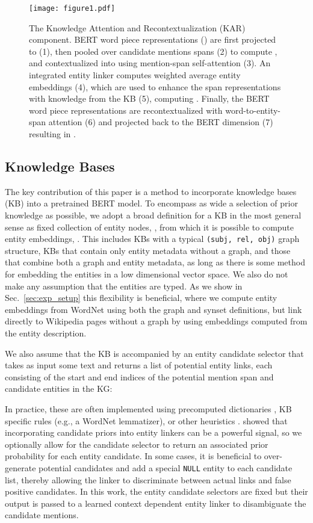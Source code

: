 \documentclass[11pt,a4paper]{article}
\begin{document}
\begin{figure*}[!t]
\centering
\texttt{[image: figure1.pdf]}
\caption{The Knowledge Attention and Recontextualization (KAR) component.
BERT word piece representations () are first projected to  (1), then pooled over candidate mentions spans (2) to compute , and contextualized into  using mention-span self-attention (3).
An integrated entity linker computes weighted average entity embeddings  (4), which are used to enhance the span representations with knowledge from the KB (5), computing .
Finally, the BERT word piece representations are recontextualized with word-to-entity-span attention (6) and projected back to the BERT dimension (7) resulting in .}
\label{fig:kar}
\end{figure*}


\subsection{Knowledge Bases}
\label{sec:kg_requirements}
The key contribution of this paper is a method to incorporate knowledge bases (KB) into a pretrained BERT model. 
To encompass as wide a selection of prior knowledge as possible, we adopt a broad definition for a KB in the most general sense as fixed collection of  entity nodes, , from which it is possible to compute entity embeddings, . 
This includes KBs with a typical \texttt{(subj, rel, obj)} graph structure, KBs that contain only entity metadata without a graph, and those that combine both a graph and entity metadata, as long as there is some method for embedding the entities in a low dimensional vector space.
We also do not make any assumption that the entities are typed.
As we show in Sec.~\ref{sec:exp_setup} this flexibility is beneficial, where we compute entity embeddings from WordNet using both the graph and synset definitions, but link directly to Wikipedia pages without a graph by using embeddings computed from the entity description.




We also assume that the KB is accompanied by an entity candidate selector that takes as input some text and returns a list of  potential entity links, each consisting of the start and end indices of the potential mention span and  candidate entities in the KG:

In practice, these are often implemented using precomputed dictionaries \cite[e.g.,\ CrossWikis;][]{spitkovsky-chang-2012-cross}, KB specific rules (e.g., a WordNet lemmatizer), or other heuristics \cite[e.g., string match;][]{Mihaylov2018KnowledgeableRE}.
\citet{Ling2015DesignCF} showed that incorporating candidate priors into entity linkers can be a powerful signal, so we optionally allow for the candidate selector to return an associated prior probability for each entity candidate.
In some cases, it is beneficial to over-generate potential candidates and add a special \texttt{NULL} entity to each candidate list, thereby allowing the linker to discriminate between actual links and false positive candidates.
In this work, the entity candidate selectors are fixed but their output is passed to a learned context dependent entity linker to disambiguate the candidate mentions.  
\end{document}
